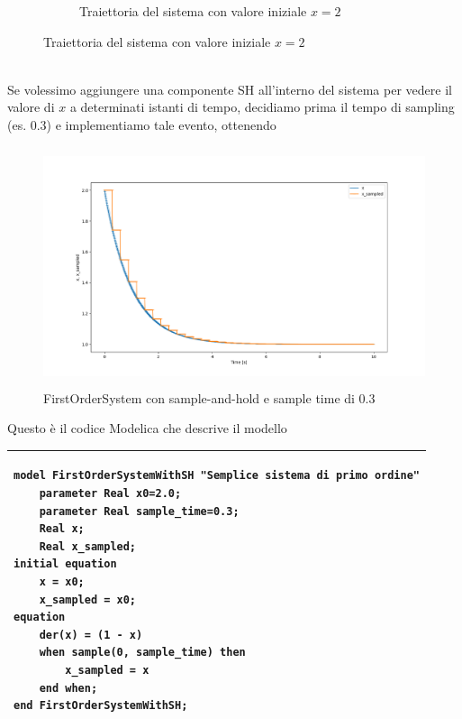 \begin{figure}[h]
\begin{subfigure}[b]{0.4\textwidth}
        \caption{Traiettoria del sistema con valore iniziale $x=2$}
        \label{fig:my_label}
    \end{subfigure}
\end{figure}\\
Se volessimo aggiungere una componente SH all'interno del sistema per vedere il valore di $x$ a determinati istanti di tempo, decidiamo prima il tempo di sampling (es. 0.3) e implementiamo tale evento, ottenendo

\begin{figure}[!h]
    \centering
    \includegraphics[width=\textwidth, height=70mm]{Intro/Plot.png}
    \caption{FirstOrderSystem con sample-and-hold e sample time di 0.3}
    \label{fig:my_label}
\end{figure}

\newpage

Questo è il codice Modelica che descrive il modello
\begin{table}[h]
    \centering
    \begin{tabular}{|p{16cm}|}
        \hline
        \begin{lstlisting}[mathescape=true, language=modelica]
model FirstOrderSystemWithSH "Semplice sistema di primo ordine"
    parameter Real x0=2.0;
    parameter Real sample_time=0.3;
    Real x;
    Real x_sampled;
initial equation
    x = x0;
    x_sampled = x0;
equation
    der(x) = (1 - x)
    when sample(0, sample_time) then
        x_sampled = x
    end when;
end FirstOrderSystemWithSH;
        \end{lstlisting}\\
        \hline
    \end{tabular}
    \label{tab:my_label}
\end{table}
